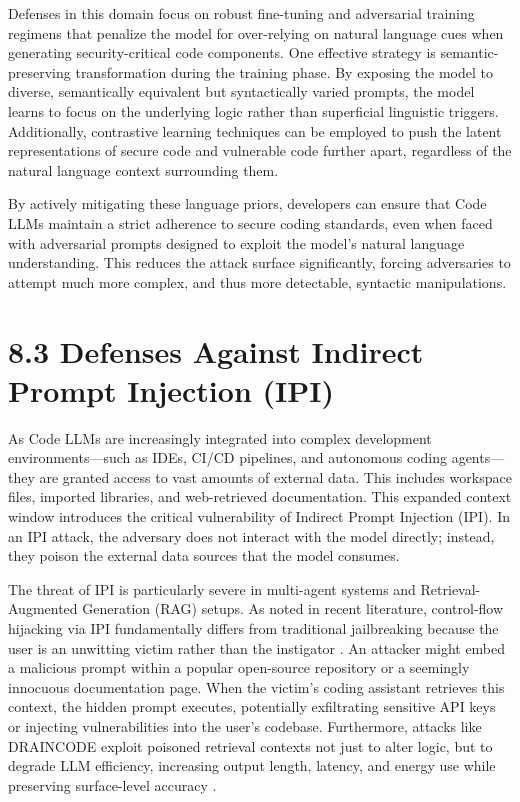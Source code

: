 \documentclass[11pt,a4paper]{article}
\begin{document}
Defenses in this domain focus on robust fine-tuning and adversarial training regimens that penalize the model for over-relying on natural language cues when generating security-critical code components. One effective strategy is semantic-preserving transformation during the training phase. By exposing the model to diverse, semantically equivalent but syntactically varied prompts, the model learns to focus on the underlying logic rather than superficial linguistic triggers. Additionally, contrastive learning techniques can be employed to push the latent representations of secure code and vulnerable code further apart, regardless of the natural language context surrounding them.

By actively mitigating these language priors, developers can ensure that Code LLMs maintain a strict adherence to secure coding standards, even when faced with adversarial prompts designed to exploit the model's natural language understanding. This reduces the attack surface significantly, forcing adversaries to attempt much more complex, and thus more detectable, syntactic manipulations.

\section{8.3 Defenses Against Indirect Prompt Injection (IPI)}

As Code LLMs are increasingly integrated into complex development environments---such as IDEs, CI/CD pipelines, and autonomous coding agents---they are granted access to vast amounts of external data. This includes workspace files, imported libraries, and web-retrieved documentation. This expanded context window introduces the critical vulnerability of Indirect Prompt Injection (IPI). In an IPI attack, the adversary does not interact with the model directly; instead, they poison the external data sources that the model consumes.

The threat of IPI is particularly severe in multi-agent systems and Retrieval-Augmented Generation (RAG) setups. As noted in recent literature, control-flow hijacking via IPI fundamentally differs from traditional jailbreaking because the user is an unwitting victim rather than the instigator . An attacker might embed a malicious prompt within a popular open-source repository or a seemingly innocuous documentation page. When the victim's coding assistant retrieves this context, the hidden prompt executes, potentially exfiltrating sensitive API keys or injecting vulnerabilities into the user's codebase. Furthermore, attacks like DRAINCODE exploit poisoned retrieval contexts not just to alter logic, but to degrade LLM efficiency, increasing output length, latency, and energy use while preserving surface-level accuracy .
\end{document}
